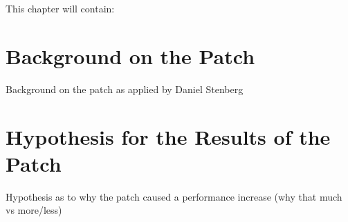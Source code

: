 This chapter will contain:

\section{Background on the Patch}

Background on the patch as applied by Daniel Stenberg

\section{Hypothesis for the Results of the Patch}

Hypothesis as to why the patch caused a performance increase (why that much vs more/less)





